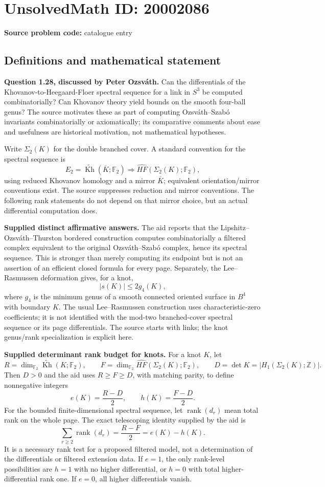 \documentclass[11pt]{article}
\newcommand{\Z}{\mathbb{Z}}
\newcommand{\F}{\mathbb{F}}
\begin{document}
\section*{UnsolvedMath ID: 20002086}
\textbf{Source problem code:} catalogue entry
\subsection{Definitions and mathematical statement}
\textbf{Question 1.28, discussed by Peter Ozsv\'ath.} Can the differentials of the Khovanov-to-Heegaard-Floer spectral sequence for a link in $S^3$ be computed combinatorially? Can Khovanov theory yield bounds on the smooth four-ball genus? The source motivates these as part of computing Ozsv\'ath--Szab\'o invariants combinatorially or axiomatically; its comparative comments about ease and usefulness are historical motivation, not mathematical hypotheses.

Write $\Sigma_2(K)$ for the double branched cover. A standard convention for the spectral sequence is
\[
 E_2=\widetilde{\operatorname{Kh}}(\overline K;\F_2)
       \Longrightarrow\widehat{HF}(\Sigma_2(K);\F_2),
\]
using reduced Khovanov homology and a mirror $\overline K$; equivalent orientation/mirror conventions exist. The source suppresses reduction and mirror conventions. The following rank statements do not depend on that mirror choice, but an actual differential computation does.

\textbf{Supplied distinct affirmative answers.} The aid reports that the Lipshitz--Ozsv\'ath--Thurston bordered construction computes combinatorially a filtered complex equivalent to the original Ozsv\'ath--Szab\'o complex, hence its spectral sequence. This is stronger than merely computing its endpoint but is not an assertion of an efficient closed formula for every page. Separately, the Lee--Rasmussen deformation gives, for a knot,
\[
 |s(K)|\le2g_4(K),
\]
where $g_4$ is the minimum genus of a smooth connected oriented surface in $B^4$ with boundary $K$. The usual Lee--Rasmussen construction uses characteristic-zero coefficients; it is not identified with the mod-two branched-cover spectral sequence or its page differentials. The source starts with links; the knot genus/rank specialization is explicit here.

\textbf{Supplied determinant rank budget for knots.} For a knot $K$, let
\[
 R=\dim_{\F_2}\widetilde{\operatorname{Kh}}(K;\F_2),\qquad
 F=\dim_{\F_2}\widehat{HF}(\Sigma_2(K);\F_2),\qquad
 D=\det K=|H_1(\Sigma_2(K);\Z)|.
\]
Then $D>0$ and the aid uses $R\ge F\ge D$, with matching parity, to define nonnegative integers
\[
 e(K)=\frac{R-D}{2},\qquad h(K)=\frac{F-D}{2}.
\]
For the bounded finite-dimensional spectral sequence, let $\operatorname{rank}(d_r)$ mean total rank on the whole page. The exact telescoping identity supplied by the aid is
\[
 \sum_{r\ge2}\operatorname{rank}(d_r)
     =\frac{R-F}{2}=e(K)-h(K).
\]
It is a necessary rank test for a proposed filtered model, not a determination of the differentials or filtered extension data. If $e=1$, the only rank-level possibilities are $h=1$ with no higher differential, or $h=0$ with total higher-differential rank one. If $e=0$, all higher differentials vanish.
\end{document}
